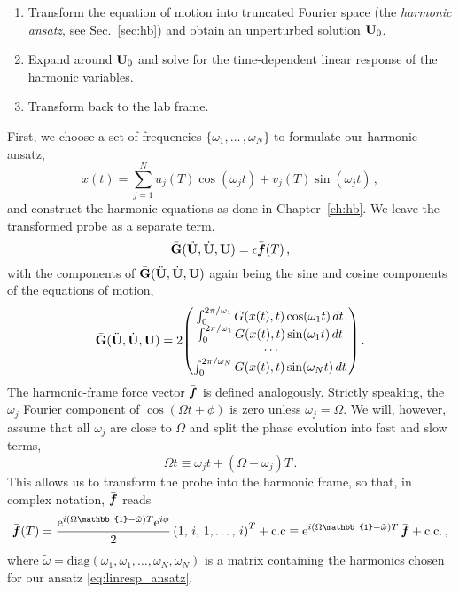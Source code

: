 \begin{enumerate}
	\item Transform the equation of motion into truncated Fourier space (the \textit{harmonic ansatz}, see Sec.~\ref{sec:hb}) and obtain an unperturbed solution $\vb{U}_0$. 
	\item Expand around $\vb{U}_0$ and solve for the time-dependent linear response of the harmonic variables. 
	\item Transform back to the lab frame. 
\end{enumerate}
First, we choose a set of frequencies $\{ \omega_1,\ldots \,, \omega_N\}$ to formulate our harmonic ansatz,
%
\begin{equation} \label{eq:linresp_ansatz}
	x(t) = \sum_{j=1}^{N} u_j(T) \cos(\omega_j t) + v_j(T) \sin(\omega_j t)\,,
\end{equation}
%
and construct the harmonic equations as done in Chapter~\ref{ch:hb}. We leave the transformed probe as a separate term,
\begin{equation} \label{eq:linresp_harmeq}
\bar{\vb{G}}(\ddot{\vb{U}}, \dot{\vb{U}},\vb{U}) = \epsilon \bar{\boldsymbol{f}}(T)\,,
\end{equation}
with the components of $\bar{\vb{G}}(\ddot{\vb{U}}, \dot{\vb{U}},\vb{U})$ again being the sine and cosine components of the equations of motion,
\begin{equation}
\bar{\vb{G}}(\ddot{\vb{U}}, \dot{\vb{U}},\vb{U}) = 2  \mqty( \int_{0}^{2\pi/\omega_1}G(x(t),t) \cos(\omega_{1} t) \, dt \,
\\   \int_{0}^{2\pi/\omega_1} G(x(t),t) \sin(\omega_{1} t) \, dt \,
\\ \cdots 
\\  \int_{0}^{2\pi/\omega_N} G(x(t),t) \sin(\omega_{N} t) \, dt \,)  \,.
\end{equation}
The harmonic-frame force vector $\bar{\boldsymbol{f}}$ is defined analogously. Strictly speaking, the $\omega_j$ Fourier component of $\cos(\Omega t + \phi)$ is zero unless $\omega_j = \Omega$. We will, however, assume that all $\omega_j$ are close to $\Omega$ and split the phase evolution into fast and slow terms,
\begin{equation}
\Omega t \equiv \omega_j t + (\Omega - \omega_j) T \,.
\end{equation}
This allows us to transform the probe into the harmonic frame, so that, in complex notation, $\bar{\boldsymbol{f}}$ reads
\begin{equation}
\bbar{f}(T) = \frac{\e^{i(\Omega\mathbb{1} - \tilde{\omega})T} \e^{i \phi}}{2} \left(1,\,i,\,1, \ldots ,\,i \right)^T + \text{c.c} \equiv \e^{i(\Omega \mathbb{1} - \tilde{\omega})T}\, \bbar{f} + \text{c.c.}\,,
\end{equation}
where $\tilde{\omega} =  \text{diag}(\omega_1, \omega_1, \ldots, \omega_N, \omega_N)$ is a matrix containing the harmonics chosen for our ansatz \eqref{eq:linresp_ansatz}.

